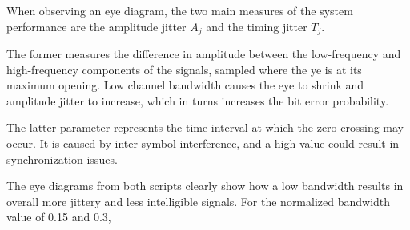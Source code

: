 
When observing an eye diagram, the two main measures of the system performance are the amplitude jitter $A_j$ and the timing jitter $T_j$.

The former measures the difference in amplitude between the low-frequency and high-frequency components of the signals, sampled where the ye is at its maximum opening.
Low channel bandwidth causes the eye to shrink and amplitude jitter to increase, which in turns increases the bit error probability.

The latter parameter represents the time interval at which the zero-crossing may occur.
It is caused by inter-symbol interference, and a high value could result in synchronization issues.


The eye diagrams from both scripts clearly show how a low bandwidth results in overall more jittery and less intelligible signals.
For the normalized bandwidth value of 0.15 and 0.3, 
